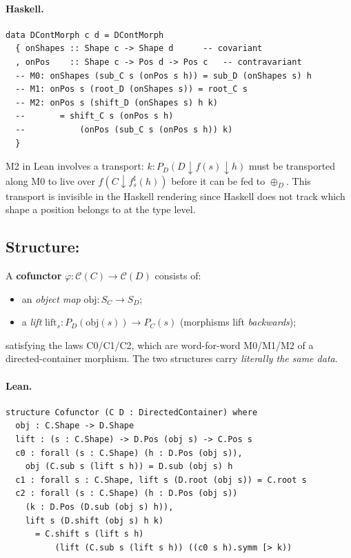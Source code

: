 \documentclass[11pt,a4paper]{article}
\begin{document}
\paragraph{Haskell.}
\begin{lstlisting}[style=haskell]
data DContMorph c d = DContMorph
  { onShapes :: Shape c -> Shape d      -- covariant
  , onPos    :: Shape c -> Pos d -> Pos c   -- contravariant
  -- M0: onShapes (sub_C s (onPos s h)) = sub_D (onShapes s) h
  -- M1: onPos s (root_D (onShapes s)) = root_C s
  -- M2: onPos s (shift_D (onShapes s) h k)
  --       = shift_C s (onPos s h)
  --           (onPos (sub_C s (onPos s h)) k)
  }
\end{lstlisting}

\begin{fidelitynote}
M2 in Lean involves a transport: $k : P_D(D \!\downarrow\! f(s) \!\downarrow\! h)$
must be transported along M0 to live over $f(C \!\downarrow\! f^\sharp_s(h))$ before
it can be fed to $\oplus_D$.  This transport is invisible in the Haskell
rendering since Haskell does not track which shape a position belongs to
at the type level.
\end{fidelitynote}


\subsection{Structure: }

\begin{defn}[Cofunctor]
A \textbf{cofunctor} $\varphi : \mathcal{C}(C) \to \mathcal{C}(D)$ consists of:
\begin{itemize}
  \item an \emph{object map} $\mathrm{obj} : S_C \to S_D$;
  \item a \emph{lift} $\mathrm{lift}_s : P_D(\mathrm{obj}(s)) \to P_C(s)$
        (morphisms lift \emph{backwards});
\end{itemize}
satisfying the laws C0/C1/C2, which are word-for-word M0/M1/M2 of a directed-container
morphism.  The two structures carry \emph{literally the same data}.
\end{defn}

\paragraph{Lean.}
\begin{lstlisting}[style=lean]
structure Cofunctor (C D : DirectedContainer) where
  obj : C.Shape -> D.Shape
  lift : (s : C.Shape) -> D.Pos (obj s) -> C.Pos s
  c0 : forall (s : C.Shape) (h : D.Pos (obj s)),
    obj (C.sub s (lift s h)) = D.sub (obj s) h
  c1 : forall s : C.Shape, lift s (D.root (obj s)) = C.root s
  c2 : forall (s : C.Shape) (h : D.Pos (obj s))
    (k : D.Pos (D.sub (obj s) h)),
    lift s (D.shift (obj s) h k)
      = C.shift s (lift s h)
          (lift (C.sub s (lift s h)) ((c0 s h).symm [> k))
\end{lstlisting}
\end{document}

